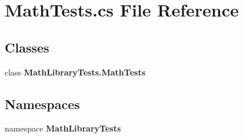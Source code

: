 \section{Math\+Tests.\+cs File Reference}
\label{_math_tests_8cs}
\subsection*{Classes}
\begin{DoxyCompactItemize}
\item 
class \textbf{ Math\+Library\+Tests.\+Math\+Tests}
\end{DoxyCompactItemize}
\subsection*{Namespaces}
\begin{DoxyCompactItemize}
\item 
namespace \textbf{ Math\+Library\+Tests}
\end{DoxyCompactItemize}
